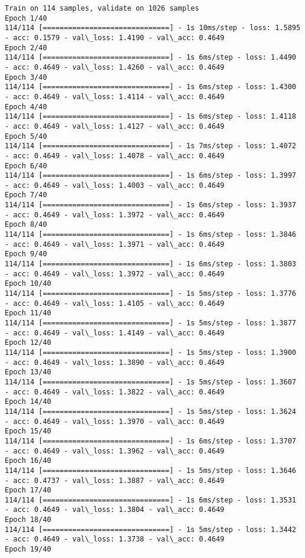 \documentclass[11pt]{article}
\begin{document}
    \begin{Verbatim}[commandchars=\\\{\}]
Train on 114 samples, validate on 1026 samples
Epoch 1/40
114/114 [==============================] - 1s 10ms/step - loss: 1.5895 - acc: 0.1579 - val\_loss: 1.4190 - val\_acc: 0.4649
Epoch 2/40
114/114 [==============================] - 1s 6ms/step - loss: 1.4490 - acc: 0.4649 - val\_loss: 1.4260 - val\_acc: 0.4649
Epoch 3/40
114/114 [==============================] - 1s 6ms/step - loss: 1.4300 - acc: 0.4649 - val\_loss: 1.4114 - val\_acc: 0.4649
Epoch 4/40
114/114 [==============================] - 1s 6ms/step - loss: 1.4118 - acc: 0.4649 - val\_loss: 1.4127 - val\_acc: 0.4649
Epoch 5/40
114/114 [==============================] - 1s 7ms/step - loss: 1.4072 - acc: 0.4649 - val\_loss: 1.4078 - val\_acc: 0.4649
Epoch 6/40
114/114 [==============================] - 1s 6ms/step - loss: 1.3997 - acc: 0.4649 - val\_loss: 1.4003 - val\_acc: 0.4649
Epoch 7/40
114/114 [==============================] - 1s 6ms/step - loss: 1.3937 - acc: 0.4649 - val\_loss: 1.3972 - val\_acc: 0.4649
Epoch 8/40
114/114 [==============================] - 1s 6ms/step - loss: 1.3846 - acc: 0.4649 - val\_loss: 1.3971 - val\_acc: 0.4649
Epoch 9/40
114/114 [==============================] - 1s 6ms/step - loss: 1.3803 - acc: 0.4649 - val\_loss: 1.3972 - val\_acc: 0.4649
Epoch 10/40
114/114 [==============================] - 1s 5ms/step - loss: 1.3776 - acc: 0.4649 - val\_loss: 1.4105 - val\_acc: 0.4649
Epoch 11/40
114/114 [==============================] - 1s 5ms/step - loss: 1.3877 - acc: 0.4649 - val\_loss: 1.4149 - val\_acc: 0.4649
Epoch 12/40
114/114 [==============================] - 1s 5ms/step - loss: 1.3900 - acc: 0.4649 - val\_loss: 1.3890 - val\_acc: 0.4649
Epoch 13/40
114/114 [==============================] - 1s 5ms/step - loss: 1.3607 - acc: 0.4649 - val\_loss: 1.3822 - val\_acc: 0.4649
Epoch 14/40
114/114 [==============================] - 1s 5ms/step - loss: 1.3624 - acc: 0.4649 - val\_loss: 1.3970 - val\_acc: 0.4649
Epoch 15/40
114/114 [==============================] - 1s 6ms/step - loss: 1.3707 - acc: 0.4649 - val\_loss: 1.3962 - val\_acc: 0.4649
Epoch 16/40
114/114 [==============================] - 1s 5ms/step - loss: 1.3646 - acc: 0.4737 - val\_loss: 1.3887 - val\_acc: 0.4649
Epoch 17/40
114/114 [==============================] - 1s 6ms/step - loss: 1.3531 - acc: 0.4649 - val\_loss: 1.3804 - val\_acc: 0.4649
Epoch 18/40
114/114 [==============================] - 1s 5ms/step - loss: 1.3442 - acc: 0.4649 - val\_loss: 1.3738 - val\_acc: 0.4649
Epoch 19/40

\end{Verbatim}
\end{document}

